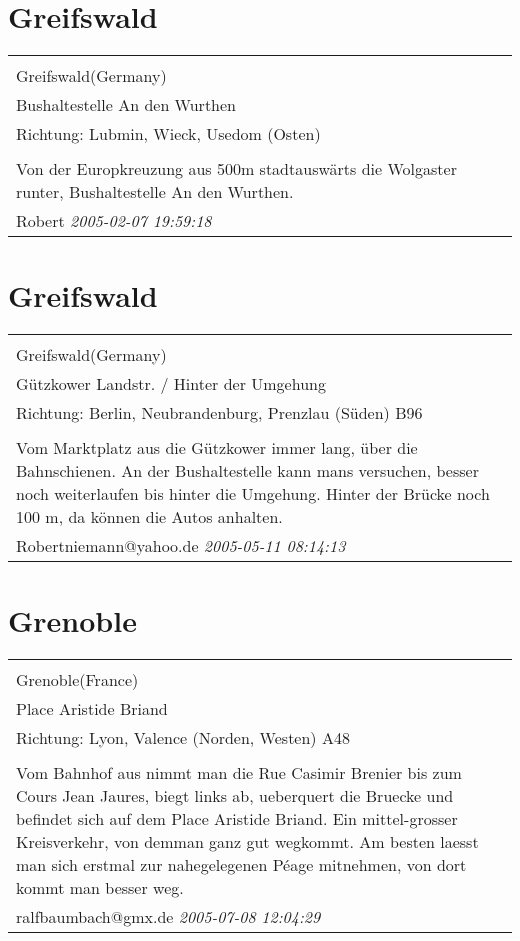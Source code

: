 \documentclass[a4paper,12pt]{article}
\begin{document}
\section{Greifswald}
\begin{tabular}{|p{13cm}|}
\hline\\
Greifswald(Germany)\\
Bushaltestelle An den Wurthen\\
Richtung: Lubmin, Wieck, Usedom (Osten) \\
\hline\\
Von der Europkreuzung aus 500m stadtauswärts die Wolgaster runter, Bushaltestelle An den Wurthen. \\
Robert \textit{ 2005-02-07 19:59:18 }\\\hline
\end{tabular}


\section{Greifswald}
\begin{tabular}{|p{13cm}|}
\hline\\
Greifswald(Germany)\\
Gützkower Landstr. / Hinter der Umgehung\\
Richtung: Berlin, Neubrandenburg, Prenzlau (Süden) B96 \\
\hline\\
Vom Marktplatz aus die Gützkower immer lang, über die Bahnschienen. An der Bushaltestelle kann mans versuchen, besser noch weiterlaufen bis hinter die Umgehung. Hinter der Brücke noch 100 m, da können die Autos anhalten. \\
Robertniemann@yahoo.de \textit{ 2005-05-11 08:14:13 }\\\hline
\end{tabular}


\section{Grenoble}
\begin{tabular}{|p{13cm}|}
\hline\\
Grenoble(France)\\
Place Aristide Briand\\
Richtung: Lyon, Valence (Norden, Westen) A48 \\
\hline\\
Vom Bahnhof aus nimmt man die Rue Casimir Brenier bis zum Cours Jean Jaures, biegt links ab, ueberquert die Bruecke und befindet sich auf dem Place Aristide Briand. Ein mittel-grosser Kreisverkehr, von demman ganz gut wegkommt. Am besten laesst man sich erstmal zur nahegelegenen Péage mitnehmen, von dort kommt man besser weg. \\
ralfbaumbach@gmx.de \textit{ 2005-07-08 12:04:29 }\\\hline
\end{tabular}
\end{document}
